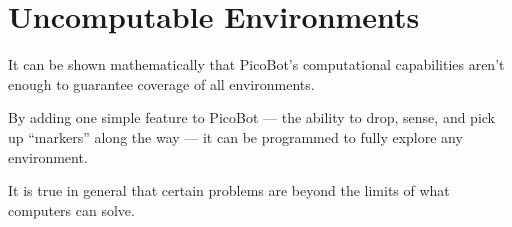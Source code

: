 \documentclass[8pt,a4paper,compress,handout]{beamer}
\begin{document}
\section{Uncomputable Environments}
\begin{frame}[fragile]
It can be shown mathematically that PicoBot's computational capabilities aren't enough to guarantee coverage of all environments.

\bigskip

By adding one simple feature to PicoBot --- the ability to drop, sense, and pick up ``markers'' along the way --- it can be programmed to fully explore any environment. 

\bigskip

It is true in general that certain problems are beyond the limits of what computers can solve.
\end{frame}
\end{document}
